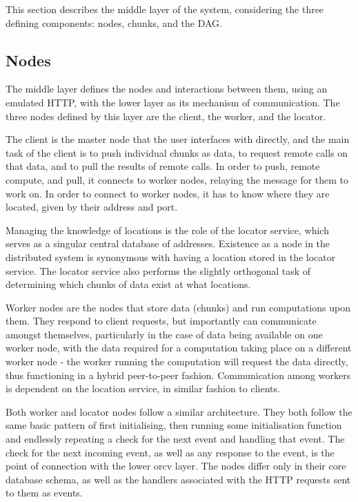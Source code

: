 This section describes the middle layer of the system, considering the three defining components: nodes, chunks, and the DAG.

\subsection{Nodes}

The middle layer  defines the nodes and interactions between them, using an emulated HTTP, with the lower  layer as its mechanism of communication.
The three nodes defined by this layer are the client, the worker, and the locator.

The client is the master node that the user interfaces with directly, and the main task of the client is to push individual chunks as data, to request remote calls on that data, and to pull the results of remote calls.
In order to push, remote compute, and pull, it connects to worker nodes, relaying the message for them to work on.
In order to connect to worker nodes, it has to know where they are located, given by their address and port.

Managing the knowledge of locations is the role of the locator service, which serves as a singular central database of addresses.
Existence as a node in the distributed system is synonymous with having a location stored in the locator service.
The locator service also performs the slightly orthogonal task of determining which chunks of data exist at what locations.

Worker nodes are the nodes that store data (chunks) and run computations upon them.
They respond to client requests, but importantly can communicate amongst themselves, particularly in the case of data being available on one worker node, with the data required for a computation taking place on a different worker node - the worker running the computation will request the data directly, thus functioning in a hybrid peer-to-peer fashion.
Communication among workers is dependent on the location service, in similar fashion to clients.

Both worker and locator nodes follow a similar architecture.
They both follow the same basic pattern of first initialising, then running some initialisation function and endlessly repeating a check for the next event and handling that event.
The check for the next incoming event, as well as any response to the event, is the point of connection with the lower orcv layer.
The nodes differ only in their core database schema, as well as the handlers associated with the HTTP requests sent to them as events.

